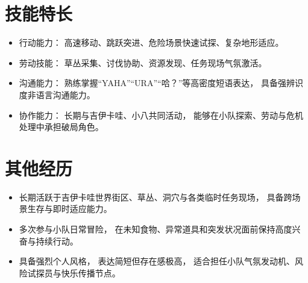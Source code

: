 \documentclass[10pt]{article}
\begin{document}

\section{
    \makebox[\widthof{\faWrench}][c]{
        \color{CHU_Blue}{\faWrench}
    }
    \quad
    技能特长
}

\begin{itemize}

    \item
    行动能力：
    高速移动、跳跃突进、危险场景快速试探、复杂地形适应。

    \item
    劳动技能：
    草丛采集、讨伐协助、资源发现、任务现场气氛激活。

    \item
    沟通能力：
    熟练掌握“YAHA”“URA”“哈？”等高密度短语表达，
    具备强辨识度非语言沟通能力。

    \item
    协作能力：
    长期与吉伊卡哇、小八共同活动，
    能够在小队探索、劳动与危机处理中承担破局角色。

\end{itemize}


\section{
    \makebox[\widthof{\faStar}][c]{
        \color{CHU_Blue}{\faStar}
    }
    \quad
    其他经历
}

\begin{itemize}

    \item
    长期活跃于吉伊卡哇世界街区、草丛、洞穴与各类临时任务现场，
    具备跨场景生存与即时适应能力。

    \item
    多次参与小队日常冒险，
    在未知食物、异常道具和突发状况面前保持高度兴奋与持续行动。

    \item
    具备强烈个人风格，
    表达简短但存在感极高，
    适合担任小队气氛发动机、风险试探员与快乐传播节点。

\end{itemize}
\end{document}

